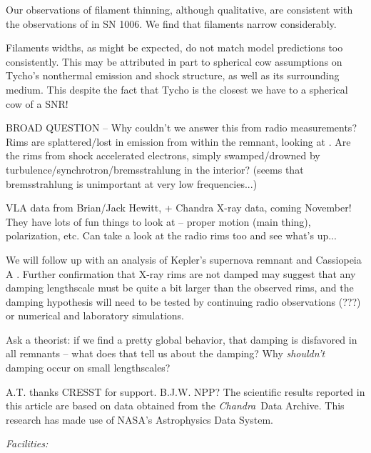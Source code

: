 \documentclass[iop, apj, numberedappendix, twocolappendix]{emulateapj}
\newcommand*{\Chandra}{\textit{Chandra}\ }
\begin{document}
Our observations of filament thinning, although qualitative, are consistent
with the observations of \citet{ressler2014} in SN 1006.
We find that filaments narrow considerably.

Filaments widths, as might be expected, do not match model predictions too
consistently.  This may be attributed in part to spherical cow assumptions on
Tycho's nonthermal emission and shock structure, as well as its surrounding
medium.  This despite the fact that Tycho is the closest we have to a spherical
cow of a SNR!

BROAD QUESTION -- Why couldn't we answer this from radio measurements?
Rims are splattered/lost in emission from within the remnant, looking at
\citet{cassam-chenai2007}.
Are the rims from shock accelerated electrons, simply swamped/drowned by
turbulence/synchrotron/bremsstrahlung in the interior? (seems that
bremsstrahlung is unimportant at very low frequencies...)

VLA data from Brian/Jack Hewitt, + Chandra X-ray data, coming November!
They have lots of fun things to look at -- proper motion (main thing),
polarization, etc.  Can take a look at the radio rims too and see what's up...

We will follow up with an analysis of Kepler's supernova remnant and
Cassiopeia A \citep[see][]{araya2010}.  Further confirmation that X-ray rims
are not damped may suggest that any damping lengthscale must be quite a bit
larger than the observed rims, and the damping hypothesis will need to be
tested by continuing radio observations (???) or numerical and laboratory
simulations.

Ask a theorist: if we find a pretty global behavior, that damping is disfavored
in all remnants -- what does that tell us about the damping?  Why
\emph{shouldn't} damping occur on small lengthscales?

\acknowledgments

A.T. thanks CRESST for support.
B.J.W. NPP?
The scientific results reported in this article are based on data obtained from
the \Chandra Data Archive.
This research has made use of NASA's Astrophysics Data System.

{\it Facilities:} 

\clearpage

%
\end{document}
